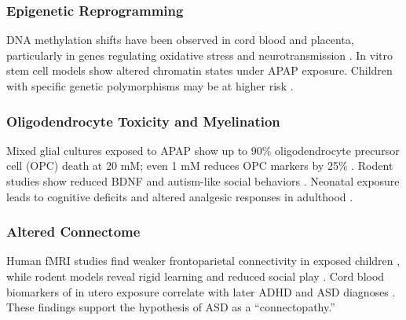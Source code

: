 \documentclass[12pt]{article}
\begin{document}
\subsubsection{Epigenetic Reprogramming}
DNA methylation shifts have been observed in cord blood and placenta, particularly in genes regulating oxidative stress and neurotransmission \citep{zhu2021}. In vitro stem cell models show altered chromatin states under APAP exposure. Children with specific genetic polymorphisms may be at higher risk \citep{schultz2008,bittker2018}.

\subsubsection{Oligodendrocyte Toxicity and Myelination}
Mixed glial cultures exposed to APAP show up to 90\% oligodendrocyte precursor cell (OPC) death at 20 mM; even 1 mM reduces OPC markers by 25\% \citep{perez2012}. Rodent studies show reduced BDNF and autism-like social behaviors \citep{blecharz2018}. Neonatal exposure leads to cognitive deficits and altered analgesic responses in adulthood \citep{viberg2014}.

\subsubsection{Altered Connectome}
Human fMRI studies find weaker frontoparietal connectivity in exposed children \citep{baker2020}, while rodent models reveal rigid learning and reduced social play \citep{viberg2014,blecharz2018}. Cord blood biomarkers of in utero exposure correlate with later ADHD and ASD diagnoses \citep{ji2020}. These findings support the hypothesis of ASD as a ``connectopathy.''
\end{document}
